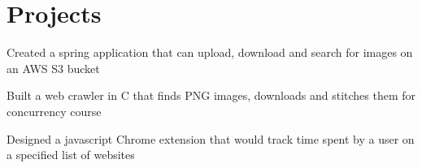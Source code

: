 \documentclass[]{hieudo-build}
\begin{document}
\begin{minipage}[t]{0.65\textwidth}
\sectionsep

\section{Projects}

\descript{}
Created a spring application that can upload, download and search for images on an AWS S3 bucket
\sectionsep 

\descript{}
Built a web crawler in C that finds PNG images, downloads and stitches them for concurrency course
\sectionsep

\descript{}
Designed a javascript Chrome extension that would track time spent by a user on a specified list of websites
\sectionsep 


\end{minipage} 
\end{document}
